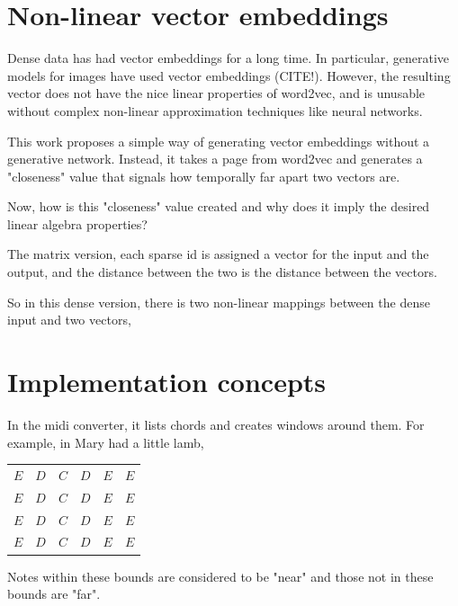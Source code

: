 \documentclass{article}
\begin{document}
\section{Non-linear vector embeddings}

Dense data has had vector embeddings for a long time. In particular, generative models for images have used vector embeddings (CITE!). However, the resulting vector does not have the nice linear properties of word2vec, and is unusable without complex non-linear approximation techniques like neural networks.

This work proposes a simple way of generating vector embeddings without a generative network. Instead, it takes a page from word2vec and generates a "closeness" value that signals how temporally far apart two vectors are. 

Now, how is this "closeness" value created and why does it imply the desired linear algebra properties?

The matrix version, each sparse id is assigned a vector for the input and the output, and the distance between the two is the distance between the vectors. 

So in this dense version, there is two non-linear mappings between the dense input and two vectors, 

\section{Implementation concepts}

In the midi converter, it lists chords and creates windows around them. For example, in Mary had a little lamb,

\newcommand{\inwindow}{\cellcolor{red!40}}
\newcommand{\windowcenter}{\cellcolor{red!80}}
\begin{tabular}{|c|c|c|c|c|c|}
	\hline
	\windowcenter $E$ & \inwindow $D$ & \inwindow $C$ & $D$ & $E$ & $E$ \\
	\inwindow $E$ & \windowcenter $D$ & \inwindow $C$ & \inwindow $D$ & $E$ & $E$ \\
	\inwindow $E$ & \inwindow $D$ & \windowcenter $C$ & \inwindow $D$ & \inwindow $E$ & $E$ \\
	 $E$ & \inwindow $D$ & \inwindow $C$ & \windowcenter $D$ & \inwindow $E$ & \inwindow $E$ \\
	\hline
\end{tabular}

Notes within these bounds are considered to be "near" and those not in these bounds are "far". 
\end{document}
